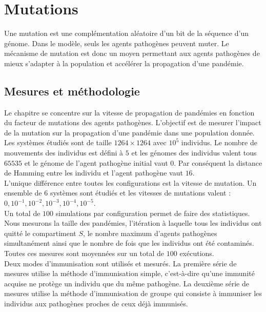\chapter{Mutations} \label{ch:mutations}

Une mutation est une complémentation aléatoire d'un bit de la séquence d'un génome. Dans le modèle, seuls les agents pathogènes peuvent muter. Le mécanisme de mutation est donc un moyen permettant aux agents pathogènes de mieux s'adapter à la population et accélérer la propagation d'une pandémie.

\section{Mesures et méthodologie}

Le chapitre se concentre sur la vitesse de propagation de pandémies en fonction du facteur de mutations des agents pathogènes. L'objectif est de mesurer l'impact de la mutation sur la propagation d'une pandémie dans une population donnée. Les systèmes étudiés sont de taille $1264 \times 1264$ avec $10^5$ individus. Le nombre de mouvements des individus est défini à $5$ et les génomes des individus valent tous $65535$ et le génome de l'agent pathogène initial vaut $0$. Par conséquent la distance de Hamming entre les individu et l'agent pathogène vaut $16$.\\

L'unique différence entre toutes les configurations est la vitesse de mutation. Un ensemble de $6$ systèmes sont étudiés et les vitesses de mutations valent : $0,10^{-1},10^{-2},10^{-3},10^{-4},10^{-5}$.\\

Un total de $100$ simulations par configuration permet de faire des statistiques. Nous mesurons la taille des pandémies, l'itération à laquelle tous les individus ont quitté le compartiment $S$, le nombre maximum d'agents pathogènes simultanément ainsi que le nombre de fois que les individus ont été contaminés. Toutes ces mesures sont moyennées sur un total de $100$ exécutions.\\

Deux modes d’immunisation sont utilisés et mesurés. La première série de mesures utilise la méthode d’immunisation simple, c’est-à-dire qu’une immunité acquise ne protège un individu que du même pathogène. La deuxième série de mesures utilise la méthode d’immunisation de groupe qui consiste à immuniser les individus aux pathogènes proches de ceux déjà immunisés.


